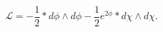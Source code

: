 \begin{equation}
\mathcal{L=-}\frac{1}{2}\ast d\phi \wedge d\phi -\frac{1}{2}e%
^{2\phi }\ast d\chi \wedge d\chi .
\end{equation}

